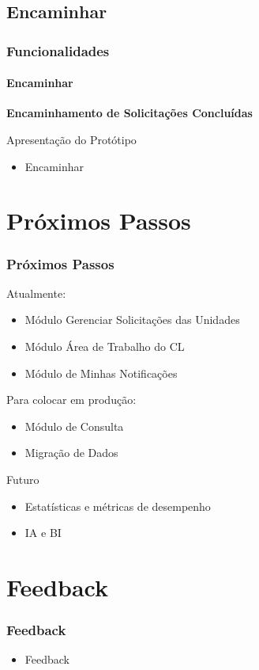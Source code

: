 \subsection{Encaminhar}

\begin{frame}
	\frametitle{Funcionalidades}
	\framesubtitle{Encaminhar}
	
	\textbf{Encaminhamento de Solicitações Concluídas}
	
	\begin{block}{Apresentação do Protótipo}
		\begin{itemize}
			\item Encaminhar
		\end{itemize}
	\end{block}	

\end{frame}

\section{Próximos Passos}

\begin{frame}
	\frametitle{Próximos Passos}

	\begin{exampleblock}{Atualmente:}
		\begin{itemize}
			\item Módulo Gerenciar Solicitações das Unidades
			\item Módulo Área de Trabalho do CL
			\item Módulo de Minhas Notificações
		\end{itemize}
	\end{exampleblock}	

	\begin{block}{Para colocar em produção:}
		\begin{itemize}
			\item Módulo de Consulta
			\item Migração de Dados 
		\end{itemize}
	\end{block}	

	\begin{alertblock}{Futuro}
		\begin{itemize}
			\item Estatísticas e métricas de desempenho
			\item IA e BI
		\end{itemize}
	\end{alertblock}	
\end{frame}



\section{Feedback}

\begin{frame}
	\frametitle{Feedback}

	\begin{itemize}
		\item Feedback
	\end{itemize}
\end{frame}
